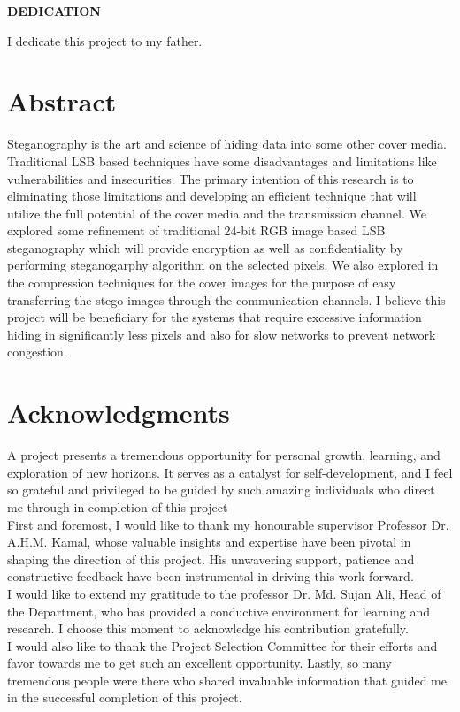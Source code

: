\documentclass{report}
\begin{document}
\newpage
\begin{center}
    \textbf{\large DEDICATION}
\end{center}
\vspace{1cm}
I dedicate this project to my father.
\thispagestyle{empty}
\restoregeometry
\section*{\centering Abstract}

Steganography is the art and science of hiding data into some other cover media. Traditional LSB based techniques have some disadvantages and limitations like vulnerabilities and insecurities. The primary intention of  this research is to eliminating those limitations and developing an efficient technique that will utilize the full potential of the cover media and the transmission channel. We explored some refinement of traditional 24-bit RGB image based LSB steganography which will provide encryption as well as confidentiality by performing steganogarphy algorithm on the selected pixels. We also explored in the compression techniques for the cover images for the purpose of easy transferring the stego-images through the communication channels. I believe this project will be beneficiary for the systems that require excessive information hiding in significantly less pixels and also for slow networks to prevent network congestion. 

\newpage

\section*{\centering Acknowledgments}
A project presents a tremendous opportunity for personal growth, learning, and exploration of new horizons. It serves as a catalyst for self-development, and I feel so grateful and privileged to be guided by such amazing individuals who direct me through in completion of this project\\ 
First and foremost, I would like to thank my honourable supervisor Professor Dr. A.H.M. Kamal, whose valuable insights and expertise have been pivotal in shaping the direction of this project. His unwavering support, patience and constructive feedback have been instrumental in driving this work forward.\\
I would like to extend my gratitude to the professor Dr. Md. Sujan Ali, Head of the Department, who has provided a conductive environment for learning and  research. I choose this moment to acknowledge his contribution gratefully.\\ 
I would also like to thank the Project Selection Committee for their efforts and favor towards me to get such an excellent opportunity. 
Lastly, so many tremendous people were there who shared invaluable information that guided me in the successful completion of this project.  
\end{document}
